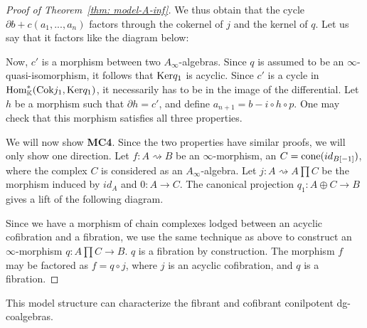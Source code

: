 \documentclass[../thesis.tex]{subfiles}
\begin{document}
\begin{proof}[Proof of Theorem~\ref{thm: model-A-inf}]
            We thus obtain that the cycle $\partial b + c(a_1, ..., a_n)$ factors through the cokernel of $j$ and the kernel of $q$. Let us say that it factors like the diagram below:
            \begin{center}
            \end{center}

            Now, $c'$ is a morphism between two $A_\infty$-algebras. Since $q$ is assumed to be an $\infty$-quasi-isomorphism, it follows that $\tt{Ker}q_1$ is acyclic. Since $c'$ is a cycle in $\tt{Hom}_\mathbb{K}^*(\tt{Cok}j_1,\tt{Ker}q_1)$, it necessarily has to be in the image of the differential. Let $h$ be a morphism such that $\partial h = c'$, and define $a_{n+1} = b - i\circ h\circ p$. One may check that this morphism satisfies all three properties.

            We will now show \textbf{MC4}. Since the two properties have similar proofs, we will only show one direction. Let $f: A \rightsquigarrow B$ be an $\infty$-morphism, an $C = \tt{cone}(id_{B[-1]})$, where the complex $C$ is considered as an $A_\infty$-algebra. Let $j: A \rightsquigarrow A\prod C$ be the morphism induced by $id_A$ and $0:A \rightarrow C$. The canonical projection $q_1: A\oplus C \rightarrow B$ gives a lift of the following diagram.

            \begin{center}
            \end{center}

            Since we have a morphism of chain complexes lodged between an acyclic cofibration and a fibration, we use the same technique as above to construct an $\infty$-morphism $q: A\prod C \rightarrow B$. $q$ is a fibration by construction. The morphism $f$ may be factored as $f = q\circ j$, where $j$ is an acyclic cofibration, and $q$ is a fibration.
        \end{proof}

        This model structure can characterize the fibrant and cofibrant conilpotent dg-coalgebras.
\end{document}
